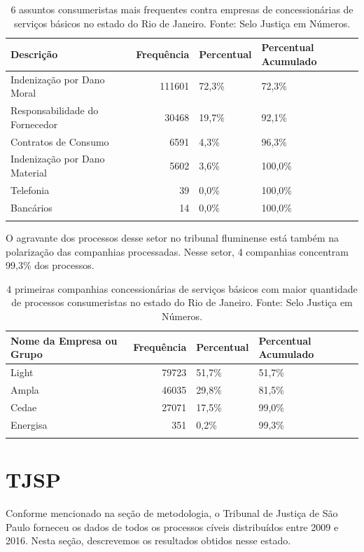 \documentclass[]{report}
\begin{document}
\begin{longtable}{lrll}
\caption{6 assuntos consumeristas mais frequentes contra empresas de concessionárias de serviços básicos no estado do Rio de Janeiro. Fonte: Selo Justiça em Números.} \\
  \hline
Descrição & Frequência & Percentual & Percentual Acumulado \\
  \hline
Indenização por Dano Moral & 111601 & 72,3\% & 72,3\% \\
  Responsabilidade do Fornecedor & 30468 & 19,7\% & 92,1\% \\
  Contratos de Consumo & 6591 & 4,3\% & 96,3\% \\
  Indenização por Dano Material & 5602 & 3,6\% & 100,0\% \\
  Telefonia &  39 & 0,0\% & 100,0\% \\
  Bancários &  14 & 0,0\% & 100,0\% \\
   \hline
\hline
\label{unnamed-chunk-26}
\end{longtable}

O agravante dos processos desse setor no tribunal fluminense está também
na polarização das companhias processadas. Nesse setor, 4 companhias
concentram 99,3\% dos processos.

\begin{longtable}{lrll}
\caption{4 primeiras companhias concessionárias de serviços básicos com maior quantidade de processos consumeristas no estado do Rio de Janeiro. Fonte: Selo Justiça em Números.} \\
  \hline
Nome da Empresa ou Grupo & Frequência & Percentual & Percentual Acumulado \\
  \hline
Light & 79723 & 51,7\% & 51,7\% \\
  Ampla & 46035 & 29,8\% & 81,5\% \\
  Cedae & 27071 & 17,5\% & 99,0\% \\
  Energisa & 351 & 0,2\% & 99,3\% \\
   \hline
\hline
\label{unnamed-chunk-27}
\end{longtable}

\section{TJSP}\label{tjsp}

Conforme mencionado na seção de metodologia, o Tribunal de Justiça de
São Paulo forneceu os dados de todos os processos cíveis distribuídos
entre 2009 e 2016. Nesta seção, descrevemos os resultados obtidos nesse
estado.
\end{document}
